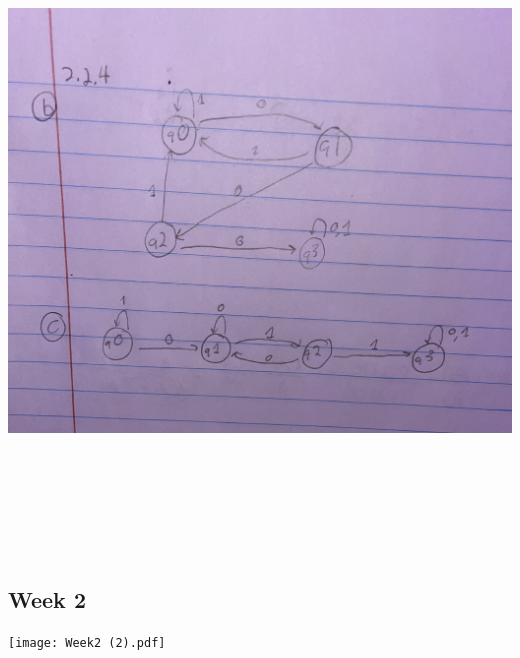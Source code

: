 \documentclass{article}
\theoremstyle{theorem}
\theoremstyle{definition}
\theoremstyle{remark}
\begin{document}
\medskip\begin{center}
\includegraphics[width=15cm, height=17.5cm]{Week1.pdf}
\end{center}

\subsection{Week 2}

\medskip\begin{center}
\texttt{[image: Week2 (2).pdf]}
\end{center}
\clearpage
\end{document}
